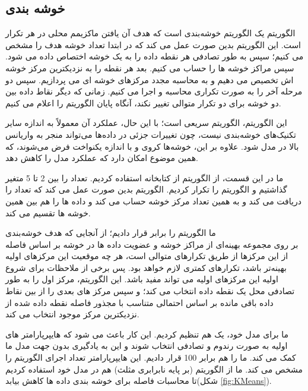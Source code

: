 \documentclass[12pt,onecolumn,a4paper]{article}
\begin{document}
\subsection{خوشه بندی }
الگوریتم  یک الگوریتم خوشه‌بندی  است که هدف آن یافتن ماکزیمم محلی در هر تکرار است. این الگوریتم بدین صورت عمل می کند که در ابتدا تعداد خوشه هدف را مشخص می کنیم؛ سپس به طور تصادفی هر نقطه داده را به یک خوشه اختصاص داده می شود. سپس مراکز خوشه ها را حساب می کنیم. بعد هر نقطه را به نزدیکترین مرکز خوشه اش تخصیص می دهیم و به محاسبه مجدد مرکزهای خوشه ای می پردازیم. سپس دو مرحله آخر را به صورت تکراری محاسبه و اجرا می کنیم. زمانی که دیگر نقاط داده بین دو خوشه برای دو تکرار متوالی تغییر نکند، آنگاه پایان الگوریتم را اعلام می کنیم.

این الگوریتم، الگوریتم سریعی است؛ با این حال، عملکرد آن معمولاً به اندازه سایر تکنیک‌های خوشه‌بندی نیست، چون تغییرات جزئی در داده‌ها می‌تواند منجر به واریانس بالا در مدل شود. علاوه بر این، خوشه‌ها کروی و با اندازه یکنواخت فرض می‌شوند، که همین موضوع امکان دارد که عملکرد مدل را کاهش دهد.

ما در این قسمت، از الگوریتم  از کتابخانه  استفاده کردیم.
تعداد  را بین 2 تا 5 متغیر گذاشتیم و الگوریتم را تکرار کردیم. الگوریتم بدین صورت عمل می کند که تعداد  را دریافت می کند و به همین تعداد مرکز خوشه حساب می کند و داده ها را هم بین همین خوشه ها تقسیم می کند.

ما الگوریتم  را برابر  قرار دادیم؛ از آنجایی که هدف خوشه‌بندی \\  بر روی مجموعه بهینه‌ای از مراکز خوشه و عضویت داده ها در خوشه بر اساس فاصله از این مرکزها از طریق تکرارهای متوالی است، هر چه موقعیت‌ این مرکزهای اولیه بهینه‌تر باشد، تکرارهای کمتری لازم خواهد بود. پس برخی از ملاحظات برای شروع اولیه این مرکزهای اولیه می تواند مفید باشد. این الگوریتم، مرکز اول را به طور تصادفی محل یک نقطه داده انتخاب می کند؛ و سپس مرکز های بعدی را از بین نقاط داده باقی مانده بر اساس احتمالی متناسب با مجذور فاصله نقطه داده شده از نزدیکترین مرکز موجود انتخاب می کند.

ما برای مدل خود، یک  هم تنظیم کردیم. این کار باعث می شود که هایپرپارامتر های اولیه به صورت رندوم و تصادفی انتخاب شوند و این به یادگیری بدون جهت مدل ما کمک می کند.
ما  را هم برابر 100 قرار دادیم. این هایپرپارامتر تعداد اجرای الگوریتم را مشخص می کند. ما از الگوریتم  (بر پایه نابرابری مثلث) هم در مدل خود استفاده کردیم تا محاسبات فاصله برای خوشه بندی داده ها کاهش بیابد(شکل \ref{fig:KMeans}).
\end{document}
